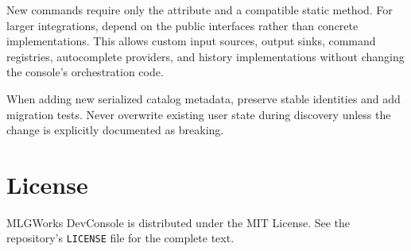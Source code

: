 \documentclass[11pt,a4paper]{article}
\begin{document}
New commands require only the attribute and a compatible static method. For larger integrations, depend on the public interfaces rather than concrete implementations. This allows custom input sources, output sinks, command registries, autocomplete providers, and history implementations without changing the console's orchestration code.

When adding new serialized catalog metadata, preserve stable identities and add migration tests. Never overwrite existing user state during discovery unless the change is explicitly documented as breaking.

\section{License}

MLGWorks DevConsole is distributed under the MIT License. See the repository's \texttt{LICENSE} file for the complete text.
\end{document}

